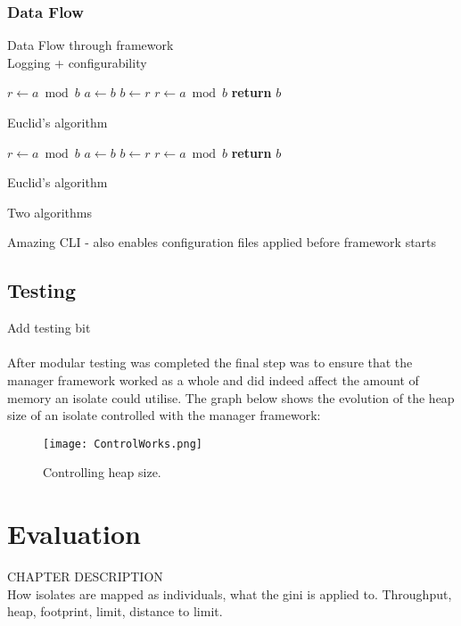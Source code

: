 \documentclass{l4proj}
\begin{document}
\subsection{Data Flow}
Data Flow through framework
\\Logging + configurability
\begin{table}[H]%
\begin{subalgorithm}{.5\textwidth}
\begin{algorithmic}[1]
    \State $r\gets a\bmod b$
      \State $a\gets b$
      \State $b\gets r$
      \State $r\gets a\bmod b$
    \EndWhile
    \State \textbf{return} $b$
  \EndProcedure
\end{algorithmic}
\caption{Euclid’s algorithm}\label{algo1}
\end{subalgorithm}%
\begin{subalgorithm}{.5\textwidth}
\begin{algorithmic}[1]
    \State $r\gets a\bmod b$
      \State $a\gets b$
      \State $b\gets r$
      \State $r\gets a\bmod b$
    \EndWhile
    \State \textbf{return} $b$
  \EndProcedure
\end{algorithmic}
\caption{Euclid’s algorithm}\label{algo2}
\end{subalgorithm}
\captionsetup{labelformat=alglabel}
\caption{Two algorithms}%
\label{tab:1}%
\end{table}
Amazing CLI - also enables configuration files applied before framework starts
\section{Testing}
Add testing bit
\\\\
\hspace*{3em} After modular testing was completed the final step was to ensure that the manager framework worked as a whole and did indeed affect the amount of memory an isolate could utilise. The graph below shows the evolution of the heap size of an isolate controlled with the manager framework:
\begin{figure}[!ht]
  \centering
    \texttt{[image: ControlWorks.png]}
  \caption{Controlling heap size.}
\end{figure}

\chapter{Evaluation}
CHAPTER DESCRIPTION\\
How isolates are mapped as individuals, what the gini is applied to.
Throughput, heap, footprint, limit, distance to limit.
\end{document}
